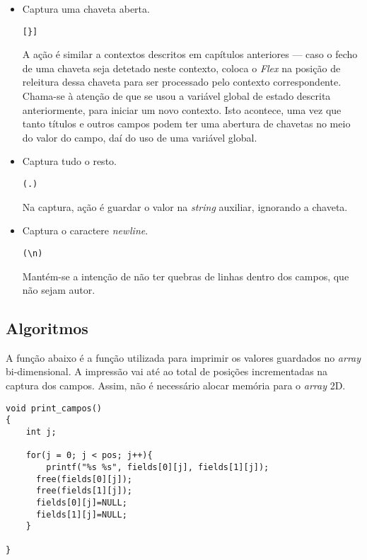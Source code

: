 \begin{itemize}
\item Captura uma chaveta aberta. 

\begin{verbatim}
[}]
\end{verbatim}

A ação é similar a contextos descritos em capítulos anteriores --- caso o fecho
de uma chaveta seja detetado neste contexto, coloca o \emph{Flex} na posição de
releitura dessa chaveta para ser processado pelo contexto correspondente.
Chama-se à atenção de que se usou a variável global de estado descrita
anteriormente, para iniciar um novo contexto. Isto acontece, uma vez que tanto
títulos e outros campos podem ter uma abertura de chavetas no meio do valor do
campo, daí do uso de uma variável global.

\item Captura tudo o resto.
\begin{verbatim}
(.)
\end{verbatim}

Na captura, ação é guardar o valor na \emph{string} auxiliar, ignorando
a chaveta. 


\item Captura o caractere \emph{newline}. 
\begin{verbatim}
(\n)
\end{verbatim}

Mantém-se a intenção de não ter quebras de linhas dentro dos campos, que não
sejam autor. 

\end{itemize}


\subsection{Algoritmos}

A função abaixo é a função utilizada para imprimir os valores guardados no
\emph{array} bi-dimensional. A impressão vai até ao total de posições
incrementadas na captura dos campos. Assim, não é necessário alocar memória para
o \emph{array} 2D. 

\begin{verbatim}
void print_campos()
{
    int j;

    for(j = 0; j < pos; j++){
        printf("%s %s", fields[0][j], fields[1][j]);
      free(fields[0][j]);
      free(fields[1][j]);
      fields[0][j]=NULL;
      fields[1][j]=NULL;
    }

}
\end{verbatim}

